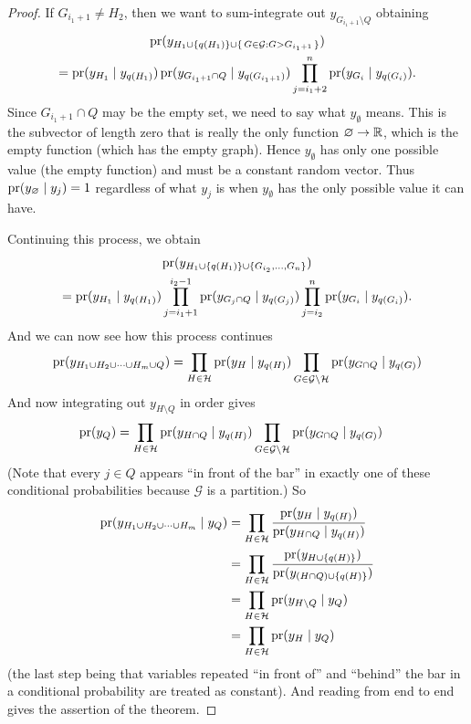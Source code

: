 \begin{proof}
If $G_{i_1 + 1} \neq H_2$, then we want to sum-integrate out
$y_{G_{i_1 + 1} \setminus Q}$ obtaining
\begin{multline*}
   \operatorname{pr}(y_{H_1 \cup \{q(H_1)\} \cup \{\, G \in \mathcal{G} : G > G_{i_1 + 1} \,\}})
   \\
   =
   \operatorname{pr}(y_{H_1} \mid y_{q(H_1)})
   \operatorname{pr}(y_{G_{i_1 + 1} \cap Q} \mid y_{q(G_{i_1 + 1})})
   \prod_{j = i_1 + 2}^n
   \operatorname{pr}(y_{G_i} \mid y_{q(G_i)}).
\end{multline*}
Since $G_{i_1 + 1} \cap Q$ may be the empty set, we need to say what
$y_\emptyset$ means.  This is the subvector of length zero that is really
the only function $\varnothing \to \mathbb{R}$, which is the empty function
(which has the empty graph).  Hence $y_\emptyset$ has only one possible
value (the empty function) and must be a constant random vector.
Thus $\operatorname{pr}(y_\varnothing \mid y_j) = 1$ regardless of what $y_j$ is when
$y_\emptyset$ has the only possible value it can have.

Continuing this process, we obtain
\begin{multline*}
   \operatorname{pr}(y_{H_1 \cup \{q(H_1)\} \cup \{ G_{i_2}, \ldots, G_n \}})
   \\
   =
   \operatorname{pr}(y_{H_1} \mid y_{q(H_1)})
   \prod_{j = i_1 + 1}^{i_2 - 1}
   \operatorname{pr}(y_{G_j \cap Q} \mid y_{q(G_j)})
   \prod_{j = i_2}^n
   \operatorname{pr}(y_{G_i} \mid y_{q(G_i)}).
\end{multline*}
And we can now see how this process continues
$$
   \operatorname{pr}(y_{H_1 \cup H_2 \cup \cdots \cup H_m \cup Q})
   =
   \prod_{H \in \mathcal{H}}
   \operatorname{pr}(y_H \mid y_{q(H)})
   \prod_{G \in \mathcal{G} \setminus \mathcal{H}}
   \operatorname{pr}(y_{G \cap Q} \mid y_{q(G)})
$$
And now integrating out $y_{H \setminus Q}$ in order gives
\begin{align*}
   \operatorname{pr}(y_Q)
   & =
   \prod_{H \in \mathcal{H}}
   \operatorname{pr}(y_{H \cap Q} \mid y_{q(H)})
   \prod_{G \in \mathcal{G} \setminus \mathcal{H}}
   \operatorname{pr}(y_{G \cap Q} \mid y_{q(G)})
\end{align*}
(Note that every $j \in Q$ appears ``in front of the bar'' in
exactly one of these conditional probabilities because $\mathcal{G}$
is a partition.)
So
\begin{align*}
   \operatorname{pr}(y_{H_1 \cup H_2 \cup \cdots \cup H_m} \mid y_Q)
   & =
   \prod_{H \in \mathcal{H}}
   \frac{ \operatorname{pr}(y_H \mid y_{q(H)}) }{ \operatorname{pr}(y_{H \cap Q} \mid y_{q(H)}) }
   \\
   & =
   \prod_{H \in \mathcal{H}}
   \frac{ \operatorname{pr}(y_{H \cup \{q(H)\}}) }{ \operatorname{pr}(y_{(H \cap Q) \cup \{q(H)\}}) }
   \\
   & =
   \prod_{H \in \mathcal{H}}
   \operatorname{pr}( y_{H \setminus Q} \mid y_{Q} )
   \\
   & =
   \prod_{H \in \mathcal{H}}
   \operatorname{pr}( y_H \mid y_{Q} )
\end{align*}
(the last step being that variables repeated ``in front of'' and ``behind''
the bar in a conditional probability are treated as constant).
And reading from end to end gives the assertion of the theorem.
\end{proof}

